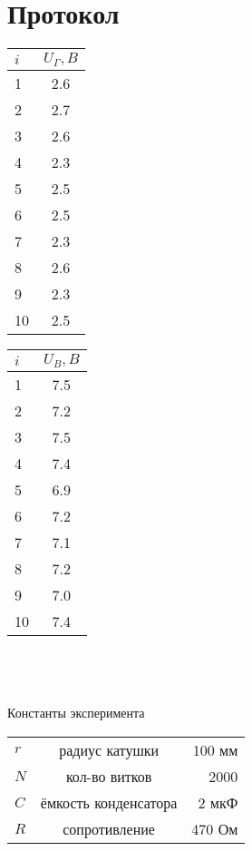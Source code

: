 \section*{Протокол}

\begin{tabular}{|l|c|}
	\hline
	$ i $ & $ U_\Gamma, B $ \\
	\hline
	1 & 2.6 \\
	\hline
	2 & 2.7 \\
	\hline
	3 & 2.6 \\
	\hline
	4 & 2.3 \\
	\hline
	5 & 2.5 \\
	\hline
	6 & 2.5 \\
	\hline
	7 & 2.3 \\
	\hline
	8 & 2.6 \\
	\hline
	9 & 2.3 \\
	\hline
	10 & 2.5 \\
	\hline
\end{tabular}
\quad
\begin{tabular}{|l|c|}
	\hline
	$ i $ & $ U_B, B $ \\
	\hline
	1 & 7.5 \\
	\hline
	2 & 7.2 \\
	\hline
	3 & 7.5 \\
	\hline
	4 & 7.4 \\
	\hline
	5 & 6.9 \\
	\hline
	6 & 7.2 \\
	\hline
	7 & 7.1 \\
	\hline
	8 & 7.2 \\
	\hline
	9 & 7.0 \\
	\hline
	10 & 7.4 \\
	\hline
\end{tabular}
\\
\\
\\

Константы эксперимента

\begin{tabular}{|lcr|}
	\hline
	$ r $ & радиус катушки & 100 мм\\
	$ N $ & кол-во витков & 2000\\
	$ C $ & ёмкость конденсатора & 2 мкФ\\
	$ R $ & сопротивление & 470 Ом\\
	\hline
\end{tabular}